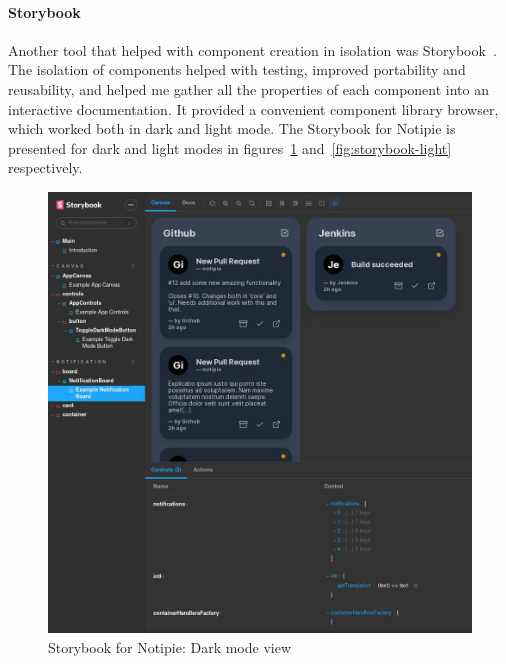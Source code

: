 \paragraph*{Storybook}\label{sec:storybook}

Another tool that helped with
component creation in isolation
was Storybook~\cite{shilman_storybook_2022}.
The isolation of components
helped with testing,
improved portability and reusability,
and helped me gather all the properties
of each component into an interactive
documentation.
It provided a convenient component library browser,
which worked both in dark and light mode.
The Storybook for Notipie is presented
for dark and light modes in
figures~\ref{fig:storybook-dark}
and~\ref{fig:storybook-light}
respectively.

\begin{figure}[p]
  \centering
  \includegraphics[width=\linewidth,keepaspectratio]{img/storybook.jpg}
  \caption{Storybook for Notipie: Dark mode view}
  \label{fig:storybook-dark}
\end{figure}

